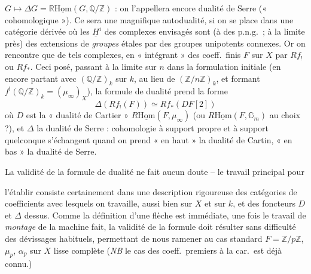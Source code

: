 \documentclass[11pt,a4paper]{article}
\begin{document}
$G \longmapsto \Delta G = \mathbb{R}\underline{\mathrm{Hom}}(G, \mathbb{Q}/\mathbb{Z})$ : on l'appellera encore dualité de Serre (« cohomologique »). Ce sera une magnifique autodualité, si on se place dans une catégorie dérivée où les $\underline{H}^i$ des complexes envisagés sont (à des p.n.g.\ ; à la limite près) des extensions de \emph{groupes} étales par des groupes unipotents connexes. Or on rencontre que de tels complexes, en « intégrant » des coeff.\ finis $F$ sur $X$ par $Rf_!$ ou $Rf_*$. Ceci posé, passant à la limite sur $n$ dans la formulation initiale (en encore partant avec $(\mathbb{Q}/\mathbb{Z})_k$ sur $k$, au lieu de $(\mathbb{Z}/n\mathbb{Z})_k$, et formant $f^!(\mathbb{Q}/\mathbb{Z})_k = (\mu_\infty)_X$), la formule de dualité prend la forme
\[
\boxed{\;\Delta(Rf_!(F)) \simeq Rf_*(DF[2])\;}
\]
où $D$ est la « dualité de Cartier » $R\underline{\mathrm{Hom}}(F, \mu_\infty)$ (ou $R\underline{\mathrm{Hom}}(F, \mathbb{G}_m)$ au choix ?), et $\Delta$ la dualité de Serre : cohomologie à support propre et à support quelconque s'échangent quand on prend « en haut » la dualité de Cartin, « en bas » la dualité de Serre.

La validité de la formule de dualité ne fait aucun doute -- le travail principal pour

l'établir consiste certainement dans une description rigoureuse des catégories de coefficients avec lesquels on travaille, aussi bien sur $X$ et sur $k$, et des foncteurs $D$ et $\Delta$ dessus. Comme la définition d'une flèche est immédiate, une fois le travail de \emph{montage} de la machine fait, la validité de la formule doit résulter sans difficulté des dévissages habituels, permettant de nous ramener au cas standard $F = \mathbb{Z}/p\mathbb{Z}$, $\mu_p$, $\alpha_p$ sur $X$ lisse complète (\emph{NB} le cas des coeff.\ premiers à la car.\ est déjà connu.)
\end{document}
